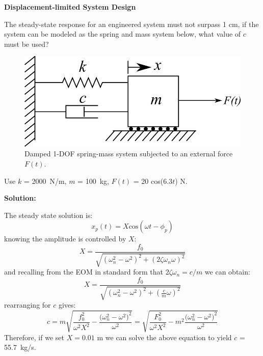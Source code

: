 \documentclass[12pt,letter]{article}
\begin{document}
\begin{example}

	\textbf{Displacement-limited System Design}

	\noindent The steady-state response for an engineered system must not surpass 1 cm, if the system can be modeled as the spring and mass system below, what value of $c$ must be used?  
	\begin{figure}[H]
		\centering
		\includegraphics[]{../figures/1-DOF-spring_dashpot_mass_horizontal_forced.png}
		\caption{Damped 1-DOF spring-mass system subjected to an external force $F(t)$.}
	\end{figure}	
	\noindent Use $k$ = 2000~N/m, $m$ = 100~kg, $F(t)$ = 20 cos($6.3t$) N. 			

	\noindent\textbf{Solution:}

	\noindent 
	 The steady state solution is:
	\begin{equation}
		x_p(t) = X \text{cos}(\omega t - \phi_p)
	\end{equation}			 
	knowing the amplitude is controlled by $X$: 
	\begin{equation}
		X = \frac{f_0}{\sqrt{(\omega_n^2 - \omega^2)^2 +  (2\zeta \omega_n \omega)^2}} 
	\end{equation}	
	and recalling from the EOM in standard form that $2\zeta \omega_n = c/m$ we can obtain:
	\begin{equation}
		X = \frac{f_0}{\sqrt{(\omega_n^2 - \omega^2)^2 +  (\frac{c}{m} \omega)^2}} 
	\end{equation}		
	rearranging for $c$ gives:		
	\begin{equation}
		c = m\sqrt{\frac{f_0^2}{\omega^2 X^2}-\frac{\big(\omega_n^2-\omega^2\big)^2}{\omega^2}} = \sqrt{\frac{F_0^2}{\omega^2 X^2}-m^2\frac{\big(\omega_n^2-\omega^2\big)^2}{\omega^2}} 
	\end{equation}
	Therefore, if we set $X=0.01$ m we can solve the above equation to yield $c$ = 55.7~kg/s.
	
\end{example}	
\end{document}
